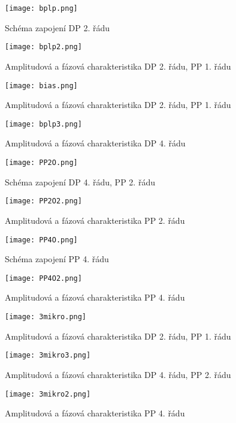 \begin{figure}[h]
\centering
\texttt{[image: bplp.png]}
\caption{Schéma zapojení DP 2. řádu}
\end{figure}
\begin{figure}[h]
\centering
\texttt{[image: bplp2.png]}
\caption{Amplitudová a fázová charakteristika DP 2. řádu, PP 1. řádu\label{s:PET}}
\end{figure}
\begin{figure}[h]
\centering
\texttt{[image: bias.png]}
\caption{Amplitudová a fázová charakteristika DP 2. řádu, PP 1. řádu\label{s:PET1}}
\end{figure}
\begin{figure}[h]
\centering
\texttt{[image: bplp3.png]}
\caption{Amplitudová a fázová charakteristika DP 4. řádu}
\end{figure}
\begin{figure}[h]
\centering
\texttt{[image: PP2O.png]}
\caption{Schéma zapojení DP 4. řádu, PP 2. řádu \label{s:DP4}}
\end{figure}
\begin{figure}[h]
\centering
\texttt{[image: PP2O2.png]}
\caption{Amplitudová a fázová charakteristika PP 2. řádu}
\end{figure}
\begin{figure}[h]
\centering
\texttt{[image: PP4O.png]}
\caption{Schéma zapojení PP 4. řádu \label{s:PP4}}
\end{figure}
\begin{figure}[h]
\centering
\texttt{[image: PP4O2.png]}
\caption{Amplitudová a fázová charakteristika PP 4. řádu}
\end{figure}
\begin{figure}[h]
\centering
\texttt{[image: 3mikro.png]}
\caption{Amplitudová a fázová charakteristika DP 2. řádu, PP 1. řádu \label{s:O1}}
\end{figure}
\begin{figure}[h]
\centering
\texttt{[image: 3mikro3.png]}
\caption{Amplitudová a fázová charakteristika DP 4. řádu, PP 2. řádu \label{s:O2}}
\end{figure}
\begin{figure}[h]
\centering
\texttt{[image: 3mikro2.png]}
\caption{Amplitudová a fázová charakteristika PP 4. řádu \label{s:O3}}
\end{figure}